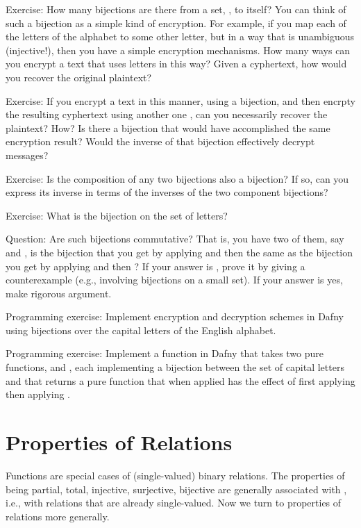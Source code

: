 \documentclass[letterpaper,10pt,english]{sphinxmanual}
\begin{document}
Exercise: How many bijections are there from a set, , to itself?
You can think of such a bijection as a simple kind of encryption. For
example, if you map each of the  letters of the alphabet to some
other letter, but in a way that is unambiguous (injective!), then you
have a simple encryption mechanisms. How many ways can you encrypt a
text that uses  letters in this way? Given a cyphertext, how would
you recover the original plaintext?

Exercise: If you encrypt a text in this manner, using a bijection,
 and then encrpty the resulting cyphertext using another one ,
can you necessarily recover the plaintext? How? Is there a 
bijection that would have accomplished the same encryption result?
Would the inverse of that bijection effectively decrypt messages?

Exercise: Is the composition of any two bijections also a bijection?
If so, can you express its inverse in terms of the inverses of the two
component bijections?

Exercise: What is the  bijection on the set of  letters?

Question: Are such bijections commutative? That is, you have two of
them, say  and , is the bijection that you get by applying 
and then  the same as the bijection you get by applying  and
then ? If your answer is , prove it by giving a counterexample
(e.g., involving bijections on a small set). If your answer is yes,
make rigorous argument.

Programming exercise: Implement encryption and decryption schemes in
Dafny using bijections over the  capital letters of the English
alphabet.

Programming exercise: Implement a  function in Dafny that
takes two pure functions,  and , each implementing a bijection
between the set of capital letters and that returns a pure function
that when applied has the effect of first applying  then applying
.


\section{Properties of Relations}
\label{\detokenize{08-relations:properties-of-relations}}
Functions are special cases of (single-valued) binary relations.  The
properties of being partial, total, injective, surjective, bijective
are generally associated with , i.e., with relations that
are already single-valued. Now we turn to properties of relations more
generally.
\end{document}
